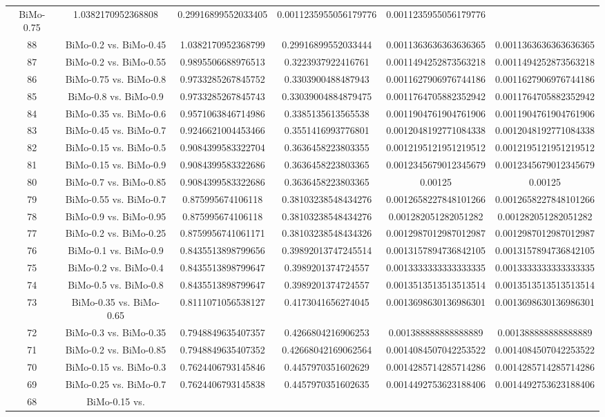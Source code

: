 \documentclass[a4paper,10pt]{article}
\begin{document}
\begin{landscape}
\begin{table}[!htp]
\begin{tabular}{cccccc}
BiMo-0.75&1.0382170952368808&0.29916899552033405&0.0011235955056179776&0.0011235955056179776\\88&BiMo-0.2 vs. BiMo-0.45&1.0382170952368799&0.29916899552033444&0.0011363636363636365&0.0011363636363636365\\87&BiMo-0.2 vs. BiMo-0.55&0.9895506688976513&0.3223937922416761&0.0011494252873563218&0.0011494252873563218\\86&BiMo-0.75 vs. BiMo-0.8&0.9733285267845752&0.3303900488487943&0.0011627906976744186&0.0011627906976744186\\85&BiMo-0.8 vs. BiMo-0.9&0.9733285267845743&0.33039004884879475&0.0011764705882352942&0.0011764705882352942\\84&BiMo-0.35 vs. BiMo-0.6&0.9571063846714986&0.3385135613565538&0.0011904761904761906&0.0011904761904761906\\83&BiMo-0.45 vs. BiMo-0.7&0.9246621004453466&0.3551416993776801&0.0012048192771084338&0.0012048192771084338\\82&BiMo-0.15 vs. BiMo-0.5&0.9084399583322704&0.3636458223803355&0.0012195121951219512&0.0012195121951219512\\81&BiMo-0.15 vs. BiMo-0.9&0.9084399583322686&0.3636458223803365&0.0012345679012345679&0.0012345679012345679\\80&BiMo-0.7 vs. BiMo-0.85&0.9084399583322686&0.3636458223803365&0.00125&0.00125\\79&BiMo-0.55 vs. BiMo-0.7&0.875995674106118&0.38103238548434276&0.0012658227848101266&0.0012658227848101266\\78&BiMo-0.9 vs. BiMo-0.95&0.875995674106118&0.38103238548434276&0.001282051282051282&0.001282051282051282\\77&BiMo-0.2 vs. BiMo-0.25&0.8759956741061171&0.38103238548434326&0.0012987012987012987&0.0012987012987012987\\76&BiMo-0.1 vs. BiMo-0.9&0.8435513898799656&0.39892013747245514&0.0013157894736842105&0.0013157894736842105\\75&BiMo-0.2 vs. BiMo-0.4&0.8435513898799647&0.3989201374724557&0.0013333333333333335&0.0013333333333333335\\74&BiMo-0.5 vs. BiMo-0.8&0.8435513898799647&0.3989201374724557&0.0013513513513513514&0.0013513513513513514\\73&BiMo-0.35 vs. BiMo-0.65&0.8111071056538127&0.4173041656274045&0.0013698630136986301&0.0013698630136986301\\72&BiMo-0.3 vs. BiMo-0.35&0.7948849635407357&0.4266804216906253&0.001388888888888889&0.001388888888888889\\71&BiMo-0.2 vs. BiMo-0.85&0.7948849635407352&0.42668042169062564&0.0014084507042253522&0.0014084507042253522\\70&BiMo-0.15 vs. BiMo-0.3&0.7624406793145846&0.4457970351602629&0.0014285714285714286&0.0014285714285714286\\69&BiMo-0.25 vs. BiMo-0.7&0.7624406793145838&0.4457970351602635&0.0014492753623188406&0.0014492753623188406\\68&BiMo-0.15 vs. 
\end{tabular}
\end{table}
\end{landscape}
\end{document}
